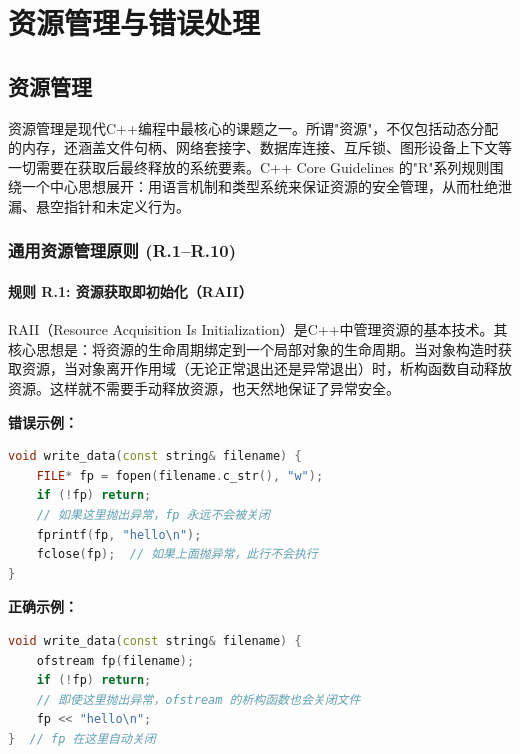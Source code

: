 
\part{资源管理与错误处理}


\chapter{资源管理}

资源管理是现代C++编程中最核心的课题之一。所谓"资源"，不仅包括动态分配的内存，还涵盖文件句柄、网络套接字、数据库连接、互斥锁、图形设备上下文等一切需要在获取后最终释放的系统要素。C++ Core Guidelines 的"R"系列规则围绕一个中心思想展开：用语言机制和类型系统来保证资源的安全管理，从而杜绝泄漏、悬空指针和未定义行为。

\section{通用资源管理原则 (R.1--R.10)}

\subsection*{\textbf{规则 R.1:} 资源获取即初始化（RAII）}

RAII（Resource Acquisition Is Initialization）是C++中管理资源的基本技术。其核心思想是：将资源的生命周期绑定到一个局部对象的生命周期。当对象构造时获取资源，当对象离开作用域（无论正常退出还是异常退出）时，析构函数自动释放资源。这样就不需要手动释放资源，也天然地保证了异常安全。

\textbf{错误示例：}

\begin{lstlisting}[language=C++]
void write_data(const string& filename) {
    FILE* fp = fopen(filename.c_str(), "w");
    if (!fp) return;
    // 如果这里抛出异常，fp 永远不会被关闭
    fprintf(fp, "hello\n");
    fclose(fp);  // 如果上面抛异常，此行不会执行
}
\end{lstlisting}

\textbf{正确示例：}

\begin{lstlisting}[language=C++]
void write_data(const string& filename) {
    ofstream fp(filename);
    if (!fp) return;
    // 即使这里抛出异常，ofstream 的析构函数也会关闭文件
    fp << "hello\n";
}  // fp 在这里自动关闭
\end{lstlisting}

